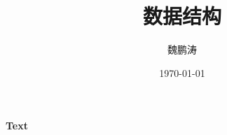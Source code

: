 \documentclass{article}
\title{\heiti 数据结构}
\author{\kaishu 魏鹏涛}
\date{\today}
\newcommand{\myfont}{\textbf{\textsf{Text}}}
\begin{document}
    \maketitle
    
    \myfont
\end{document}
